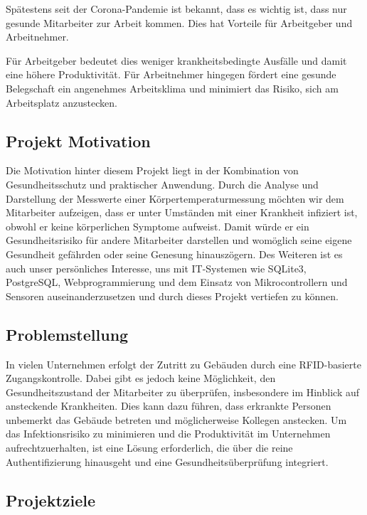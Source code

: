Spätestens seit der Corona-Pandemie ist bekannt, dass es wichtig ist, dass nur gesunde Mitarbeiter zur Arbeit kommen. Dies hat Vorteile für Arbeitgeber und Arbeitnehmer. 

\vspace{1em}
\noindent Für Arbeitgeber bedeutet dies weniger krankheitsbedingte Ausfälle und damit eine höhere Produktivität. Für Arbeitnehmer hingegen fördert eine gesunde Belegschaft ein angenehmes Arbeitsklima und minimiert das Risiko, sich am Arbeitsplatz anzustecken.


\subsection{Projekt Motivation}

Die Motivation hinter diesem Projekt liegt in der Kombination von Gesundheitsschutz und praktischer Anwendung. Durch die Analyse und Darstellung der Messwerte einer Körpertemperaturmessung möchten wir dem Mitarbeiter aufzeigen, dass er unter Umständen mit einer Krankheit infiziert ist, obwohl er keine körperlichen Symptome aufweist. Damit würde er ein Gesundheitsrisiko für andere Mitarbeiter darstellen und womöglich seine eigene Gesundheit gefährden oder seine Genesung hinauszögern.
Des Weiteren ist es auch unser persönliches Interesse, uns mit IT-Systemen wie SQLite3, PostgreSQL, Webprogrammierung und dem Einsatz von Mikrocontrollern und Sensoren auseinanderzusetzen und durch dieses Projekt vertiefen zu können.

\subsection{Problemstellung}

In vielen Unternehmen erfolgt der Zutritt zu Gebäuden durch eine RFID-basierte Zugangskontrolle. Dabei gibt es jedoch keine Möglichkeit, den Gesundheitszustand der Mitarbeiter zu überprüfen, insbesondere im Hinblick auf ansteckende Krankheiten. Dies kann dazu führen, dass erkrankte Personen unbemerkt das Gebäude betreten und möglicherweise Kollegen anstecken. Um das Infektionsrisiko zu minimieren und die Produktivität im Unternehmen aufrechtzuerhalten, ist eine Lösung erforderlich, die über die reine Authentifizierung hinausgeht und eine Gesundheitsüberprüfung integriert.

\subsection{Projektziele}

